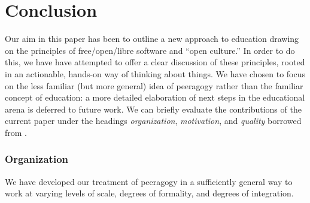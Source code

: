 \section{Conclusion}\label{sec:Conclusion}


Our aim in this paper has been to outline a new approach to education
drawing on the principles of free/open/libre software and ``open
culture.''  In order to do this, we have have attempted to offer a
clear discussion of these principles, rooted in an actionable,
hands-on way of thinking about things.  We have chosen to focus on the
less familiar (but more general) idea of peeragogy rather than the
familiar concept of education: a more detailed elaboration of next
steps in the educational arena is deferred to future work.  We can
briefly evaluate the contributions of the current paper under the
headings \emph{organization}, \emph{motivation}, and \emph{quality}
borrowed from \cite{benkler2015peer}.

\vspace{-.25\baselineskip}

\subsubsection*{Organization} 
We have developed our treatment of peeragogy in a sufficiently general
way to work at varying levels of scale, degrees of formality, and
degrees of integration.

\vspace{-.25\baselineskip}





